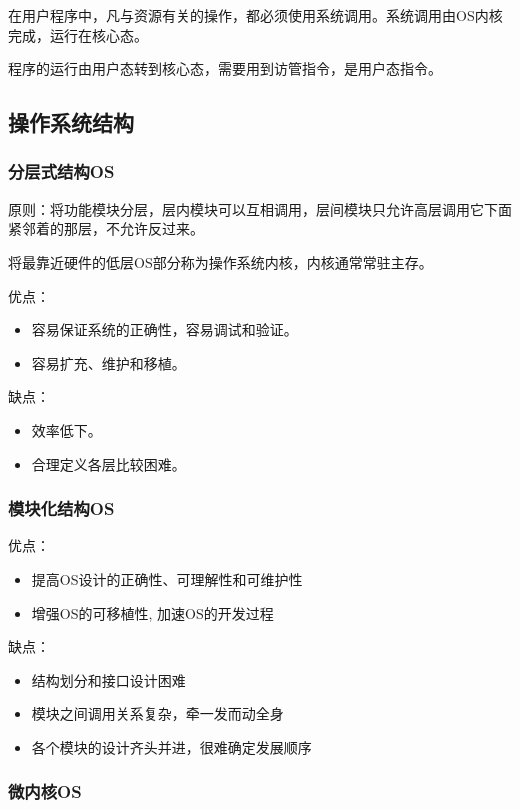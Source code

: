 \documentclass[12pt, a4paper, oneside]{ctexart}
\begin{document}
在用户程序中，凡与资源有关的操作，都必须使用系统调用。系统调用由OS内核完成，运行在核心态。

程序的运行由用户态转到核心态，需要用到访管指令，是用户态指令。

\subsection{操作系统结构}

\subsubsection{分层式结构OS}

原则：将功能模块分层，层内模块可以互相调用，层间模块只允许高层调用它下面紧邻着的那层，不允许反过来。

将最靠近硬件的低层OS部分称为操作系统内核，内核通常常驻主存。

优点：
\begin{itemize}
    \item 容易保证系统的正确性，容易调试和验证。
    \item 容易扩充、维护和移植。
\end{itemize}

缺点：
\begin{itemize}
  \item 效率低下。
  \item 合理定义各层比较困难。
\end{itemize}

\subsubsection{模块化结构OS}

优点：
\begin{itemize}
    \item 提高OS设计的正确性、可理解性和可维护性
    \item 增强OS的可移植性, 加速OS的开发过程
\end{itemize}

缺点：
\begin{itemize}
    \item 结构划分和接口设计困难
    \item 模块之间调用关系复杂，牵一发而动全身
    \item 各个模块的设计齐头并进，很难确定发展顺序
\end{itemize}

\subsubsection{微内核OS}
\end{document}
